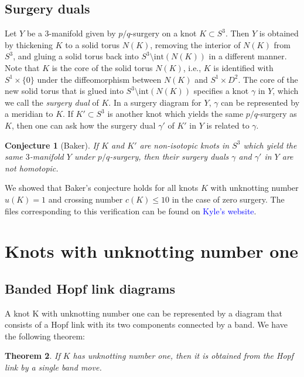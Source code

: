 \documentclass[11pt,usenames,dvipsnames,reqno]{amsart}
\newtheorem{theorem}{Theorem}
\numberwithin{theorem}{section}
\newtheorem{conjecture}[theorem]{Conjecture}
\theoremstyle{ex}
\theoremstyle{rem}
\def\kh#1{\textcolor{Blue}{#1}}
\begin{document}
\subsection{Surgery duals} Let $Y$ be a 3-manifold given by $p/q$-surgery on a knot $K\subset S^3$. Then $Y$ is obtained by thickening $K$ to a solid torus $N(K)$, removing the interior of $N(K)$ from $S^3$, and gluing a solid torus back into $S^3\setminus\mathrm{int}(N(K))$ in a different manner. Note that $K$ is the core of the solid torus $N(K)$, i.e., $K$ is identified with $S^1\times\{0\}$ under the diffeomorphism between $N(K)$ and $S^1\times D^2$. The core of the new solid torus that is glued into $S^3\setminus\mathrm{int}(N(K))$ specifies a knot $\gamma$ in $Y$, which we call the \textit{surgery dual} of $K$. In a surgery diagram for $Y$, $\gamma$ can be represented by a meridian to $K$. If $K'\subset S^3$ is another knot which yields the same $p/q$-surgery as $K$, then one can ask how the surgery dual $\gamma'$ of $K'$ in $Y$ is related to $\gamma$. 

\begin{conjecture}[Baker] If $K$ and $K'$ are non-isotopic knots in $S^3$ which yield the same $3$-manifold $Y$ under $p/q$-surgery, then their surgery duals $\gamma$ and $\gamma'$ in $Y$ are not homotopic.
\end{conjecture}

We showed that Baker's conjecture holds for all knots $K$ with unknotting number $u(K) = 1$ and crossing number $c(K) \leq 10$ in the case of zero surgery. The files corresponding to this verification can be found on \kh{Kyle's website}.


\section{Knots with unknotting number one}\label{sec:unknotting-one}


\subsection{Banded Hopf link diagrams} A knot K with unknotting number one can be represented by a diagram that consists of a Hopf link with its two components connected by a band. We have the following theorem:

\begin {theorem} If $K$ has unknotting number one, then it is obtained from the Hopf link by a single band move.
\end{theorem}
\end{document}
